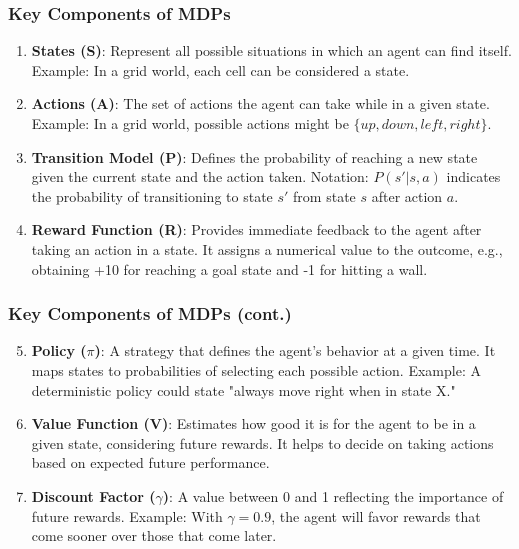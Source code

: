 \documentclass{beamer}
\begin{document}
\begin{frame}[fragile]
    \frametitle{Key Components of MDPs}
    \begin{enumerate}
        \item \textbf{States (S)}: Represent all possible situations in which an agent can find itself. 
              Example: In a grid world, each cell can be considered a state.
              
        \item \textbf{Actions (A)}: The set of actions the agent can take while in a given state. 
              Example: In a grid world, possible actions might be $\{up, down, left, right\}$.
              
        \item \textbf{Transition Model (P)}: Defines the probability of reaching a new state given the current state and the action taken. 
              Notation: $P(s' | s, a)$ indicates the probability of transitioning to state $s'$ from state $s$ after action $a$.
              
        \item \textbf{Reward Function (R)}: Provides immediate feedback to the agent after taking an action in a state. 
              It assigns a numerical value to the outcome, e.g., obtaining +10 for reaching a goal state and -1 for hitting a wall.
    \end{enumerate}
\end{frame}

\begin{frame}[fragile]
    \frametitle{Key Components of MDPs (cont.)}
    \begin{enumerate}
        \setcounter{enumi}{4}
        \item \textbf{Policy ($\pi$)}: A strategy that defines the agent’s behavior at a given time. 
              It maps states to probabilities of selecting each possible action.
              Example: A deterministic policy could state "always move right when in state X."
              
        \item \textbf{Value Function (V)}: Estimates how good it is for the agent to be in a given state, considering future rewards. 
              It helps to decide on taking actions based on expected future performance.
              
        \item \textbf{Discount Factor ($\gamma$)}: A value between 0 and 1 reflecting the importance of future rewards. 
              Example: With $\gamma = 0.9$, the agent will favor rewards that come sooner over those that come later.
    \end{enumerate}
\end{frame}
\end{document}
